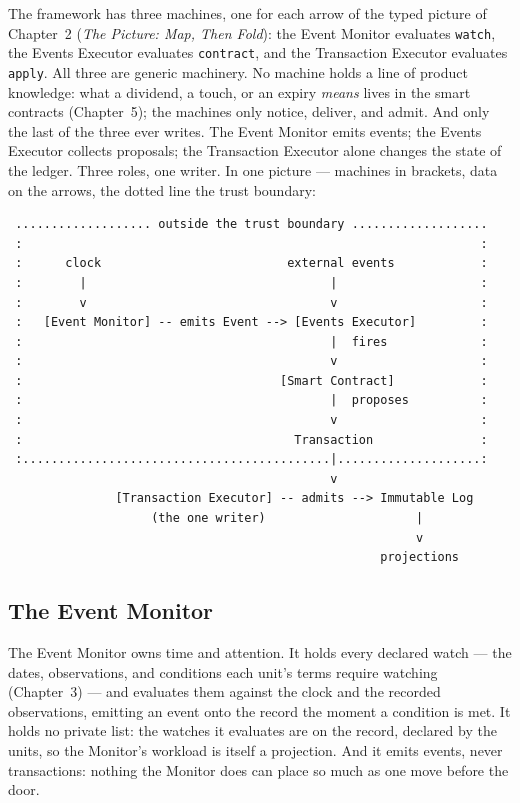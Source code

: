 \documentclass[11pt,a4paper]{article}
\begin{document}
The framework has three machines, one for each arrow of the typed picture of
Chapter~2 (\emph{The Picture: Map, Then Fold}): the Event Monitor evaluates
\texttt{watch}, the Events Executor evaluates \texttt{contract}, and the
Transaction Executor evaluates \texttt{apply}. All three are generic machinery.
No machine holds a line of product knowledge: what a dividend, a touch, or an
expiry \emph{means} lives in the smart contracts (Chapter~5); the machines only
notice, deliver, and admit. And only the last of the three ever writes. The
Event Monitor emits events; the Events Executor collects proposals; the
Transaction Executor alone changes the state of the ledger. Three roles, one
writer. In one picture --- machines in brackets, data on the arrows, the dotted
line the trust boundary:

{\small
\begin{verbatim}
 ................... outside the trust boundary ...................
 :                                                                :
 :      clock                          external events            :
 :        |                                  |                    :
 :        v                                  v                    :
 :   [Event Monitor] -- emits Event --> [Events Executor]         :
 :                                           |  fires             :
 :                                           v                    :
 :                                    [Smart Contract]            :
 :                                           |  proposes          :
 :                                           v                    :
 :                                      Transaction               :
 :...........................................|....................:
                                             v
               [Transaction Executor] -- admits --> Immutable Log
                    (the one writer)                     |
                                                         v
                                                    projections
\end{verbatim}
}

\subsection{The Event Monitor}

The Event Monitor owns time and attention. It holds every declared watch ---
the dates, observations, and conditions each unit's terms require watching
(Chapter~3) --- and evaluates them against the clock and the recorded
observations, emitting an event onto the record the moment a condition is met.
It holds no private list: the watches it evaluates are on the record, declared
by the units, so the Monitor's workload is itself a projection. And it emits
events, never transactions: nothing the Monitor does can place so much as one
move before the door.
\end{document}

